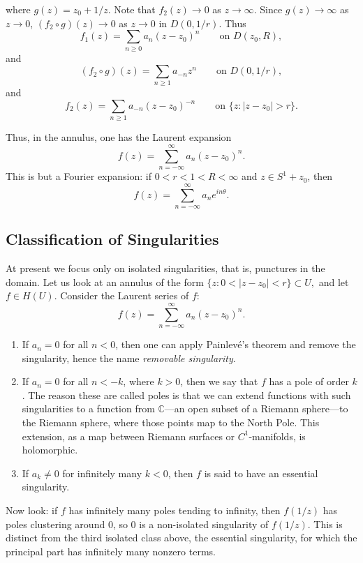 \documentclass[11pt,a4paper]{article}
\begin{document}
where $g(z)=z_0+1/z$. Note that $f_2(z)\to0$ as $z\to\infty$. Since $g(z)\to\infty$ as $z\to0$, $(f_2\circ g)(z)\to0$ as $z\to0$ in $D(0,1/r)$. Thus
\[
  f_1(z)=\sum_{n\ge0}a_n(z-z_0)^n
  \qquad\text{on }D(z_0,R),
\]
and
\[
  (f_2\circ g)(z)=\sum_{n\ge1}a_{-n}z^n
  \qquad\text{on }D(0,1/r),
\]
and
\[
  f_2(z)=\sum_{n\ge1}a_{-n}(z-z_0)^{-n}
  \qquad\text{on }\{z:|z-z_0|>r\}.
\]


Thus, in the annulus, one has the Laurent expansion
\[
  f(z)=\sum_{n=-\infty}^{\infty}a_n(z-z_0)^n.
\]
This is but a Fourier expansion: if $0<r<1<R<\infty$ and $z\in S^1+z_0$, then
\[
  f(z)=\sum_{n=-\infty}^{\infty}a_ne^{in\theta}.
\]

\subsection*{Classification of Singularities}

At present we focus only on isolated singularities, that is, punctures in the domain. Let us look at an annulus of the form \(\{z:0<|z-z_0|<r\}\subset U,\)
and let $f\in H(U)$. Consider the Laurent series of $f$:
\[
  f(z)=\sum_{n=-\infty}^{\infty}a_n(z-z_0)^n.
\]

\begin{enumerate}[label=(\roman*)]
\item If $a_n=0$ for all $n<0$, then one can apply Painlev\'e's theorem and remove the singularity, hence the name \emph{removable singularity}.

\item If $a_n=0$ for all $n<-k$, where $k>0$, then we say that $f$ has a pole of order $k$. The reason these are called poles is that we can extend functions with such singularities to a function from $\mathbb C$---an open subset of a Riemann sphere---to the Riemann sphere, where those points map to the North Pole. This extension, as a map between Riemann surfaces or $C^1$-manifolds, is holomorphic.

\item If $a_k\ne0$ for infinitely many $k<0$, then $f$ is said to have an essential singularity.
\end{enumerate}

Now look: if $f$ has infinitely many poles tending to infinity, then $f(1/z)$ has poles clustering around $0$, so $0$ is a non-isolated singularity of $f(1/z)$. This is distinct from the third isolated class above, the essential singularity, for which the principal part has infinitely many nonzero terms.
\end{document}
